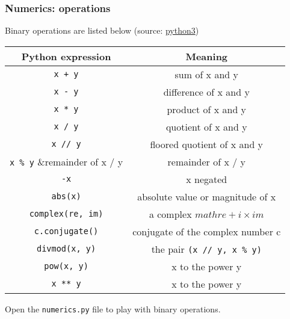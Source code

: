 \begin{frame}[fragile]
\frametitle{Numerics: operations}
\begin{center}
    Binary operations are listed below (source: \href{https://docs.python.org/3/library/stdtypes.html}{python3})
    \scriptsize
\vspace{1em}
\begin{tabular}{cc}
Python expression & Meaning\\
\hline
\verb-x + y- & sum of x and y\\
\verb+x - y+ & difference of x and y\\
\verb+x * y+ & product of x and y\\
\verb+x / y+ &quotient of x and y\\
\verb+x // y+ &floored quotient of x and y\\
\verb+x % y+ &remainder of x / y\\
\verb+-x+& x negated\\
\verb+abs(x)+ & absolute value or magnitude of x\\
\verb+complex(re, im)+& a complex $math re + i\times im$\\
\verb+c.conjugate()+ & conjugate of the complex number c\\
\verb+divmod(x, y)+ & the pair \verb+(x // y, x % y)+\\
\verb+pow(x, y)+ & x to the power y\\
\verb+x ** y+ & x to the power y\\
\end{tabular}
\end{center}

Open the \verb+numerics.py+ file to play with binary operations.

\end{frame}
